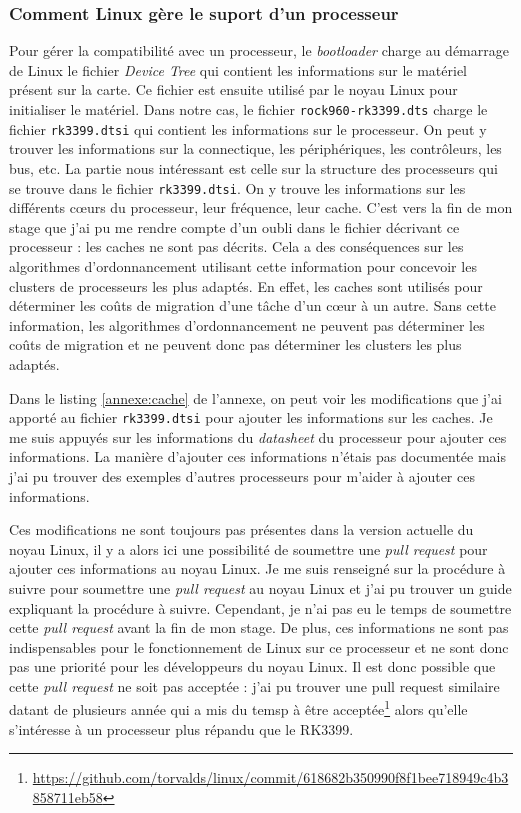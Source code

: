 \subsubsection{Comment Linux gère le suport d'un processeur}

Pour gérer la compatibilité avec un processeur, le \textit{bootloader} charge au démarrage de Linux le fichier \textit{Device Tree} qui contient les informations sur le matériel présent sur la carte. Ce fichier est ensuite utilisé par le noyau Linux pour initialiser le matériel. Dans notre cas, le fichier \texttt{rock960-rk3399.dts} charge le fichier \texttt{rk3399.dtsi} qui contient les informations sur le processeur. On peut y trouver les informations sur la connectique, les périphériques, les contrôleurs, les bus, etc.
La partie nous intéressant est celle sur la structure des processeurs qui se trouve dans le fichier \texttt{rk3399.dtsi}. On y trouve les informations sur les différents cœurs du processeur, leur fréquence, leur cache. C'est vers la fin de mon stage que j'ai pu me rendre compte d'un oubli dans le fichier décrivant ce processeur : les caches ne sont pas décrits. Cela a des conséquences sur les algorithmes d'ordonnancement utilisant cette information pour concevoir les clusters de processeurs les plus adaptés. En effet, les caches sont utilisés pour déterminer les coûts de migration d'une tâche d'un cœur à un autre. Sans cette information, les algorithmes d'ordonnancement ne peuvent pas déterminer les coûts de migration et ne peuvent donc pas déterminer les clusters les plus adaptés. 

Dans le listing \ref{annexe:cache} de l'annexe, on peut voir les modifications que j'ai apporté au fichier \texttt{rk3399.dtsi} pour ajouter les informations sur les caches. Je me suis appuyés sur les informations du \textit{datasheet} du processeur pour ajouter ces informations. La manière d'ajouter ces informations n'étais pas documentée mais j'ai pu trouver des exemples d'autres processeurs pour m'aider à ajouter ces informations.

Ces modifications ne sont toujours pas présentes dans la version actuelle du noyau Linux, il y a alors ici une possibilité de soumettre une \textit{pull request} pour ajouter ces informations au noyau Linux. Je me suis renseigné sur la procédure à suivre pour soumettre une \textit{pull request} au noyau Linux et j'ai pu trouver un guide\cite{kernel-contribute} expliquant la procédure à suivre. Cependant, je n'ai pas eu le temps de soumettre cette \textit{pull request} avant la fin de mon stage. De plus, ces informations ne sont pas indispensables pour le fonctionnement de Linux sur ce processeur et ne sont donc pas une priorité pour les développeurs du noyau Linux. Il est donc possible que cette \textit{pull request} ne soit pas acceptée : j'ai pu trouver une pull request similaire datant de plusieurs année qui a mis du temsp à être acceptée\footnote{\href{https://github.com/torvalds/linux/commit/618682b350990f8f1bee718949c4b3858711eb58}{https://github.com/torvalds/linux/commit/618682b350990f8f1bee718949c4b3858711eb58}} alors qu'elle s'intéresse à un processeur plus répandu que le RK3399.




